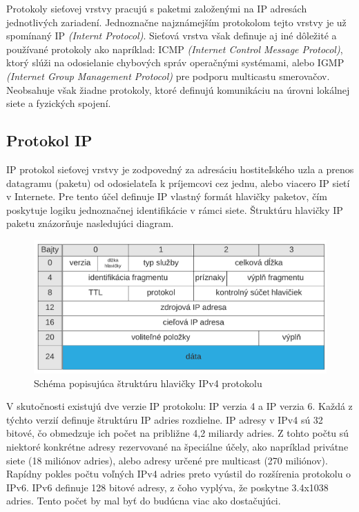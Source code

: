 \documentclass[
  digital, %
  table,   %
  lof,     %
  nolot,   %
  nocover
]{fithesis3}
\begin{document}
Protokoly sieťovej vrstvy pracujú s paketmi založenými na IP adresách
jednotlivých zariadení. Jednoznačne najznámejším protokolom tejto vrstvy je už
spomínaný IP \textit{(Internt Protocol)}. Sieťová vrstva však definuje aj iné
dôležité a používané protokoly ako napríklad: ICMP
\textit{(Internet Control Message Protocol)}, ktorý slúži na odosielanie
chybových správ operačnými systémami, alebo IGMP
\textit{(Internet Group Management Protocol)} pre podporu multicastu smerovačov.
Neobsahuje však žiadne protokoly, ktoré definujú komunikáciu na
úrovni lokálnej siete a fyzických spojení.

\subsection{Protokol IP}
IP protokol sieťovej vrstvy je zodpovedný za adresáciu hostiteľského uzla a
prenos datagramu (paketu) od odosielateľa k príjemcovi cez jednu, alebo viacero
IP sietí v Internete. Pre tento účel definuje IP vlastný formát hlavičky paketov, čím
poskytuje logiku jednoznačnej identifikácie v rámci siete. Štruktúru hlavičky
IP paketu znázorňuje nasledujúci diagram.

\begin{figure}[h]
  \centering
    \includegraphics[width=.95\textwidth]{images/net-ip-head.png}
  \caption{Schéma popisujúca štruktúru hlavičky IPv4 protokolu}
  \label{fig:net-ip-head}
\end{figure}

V skutočnosti existujú dve verzie IP protokolu: IP verzia 4 a IP verzia 6.
Každá z týchto verzií definuje štruktúru IP adries rozdielne. IP adresy v IPv4
sú 32 bitové, čo obmedzuje ich počet na približne 4,2 miliardy adries. Z tohto
počtu sú niektoré konkrétne adresy rezervované na špeciálne účely, ako napríklad
privátne siete (18 miliónov adries), alebo adresy určené pre multicast
(270 miliónov). Rapídny pokles počtu voľných IPv4 adries preto vyústil do
rozšírenia protokolu o IPv6. IPv6 definuje 128 bitové adresy, z čoho vyplýva,
že poskytne 3.4x1038 adries. Tento počet by mal byť do budúcna viac ako
dostačujúci.
\end{document}
